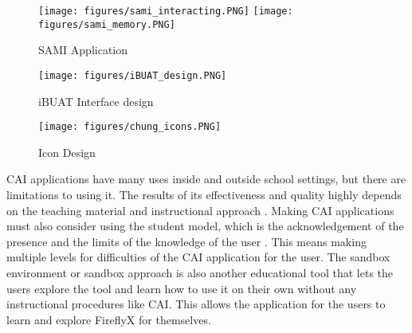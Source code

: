 \begin{figure}[H]
    \centering
    \texttt{[image: figures/sami\_interacting.PNG]}
    \texttt{[image: figures/sami\_memory.PNG]}
    \caption{SAMI Application \protect\cite{paule2017music}}
    \label{fig:sami_memory}
\end{figure}


\begin{figure}[H]
    \centering
    \texttt{[image: figures/iBUAT\_design.PNG]}
    \caption{iBUAT Interface design \protect\cite{ibharim2014ibuat}}
    \label{fig:iBuAT_ui}
\end{figure}


\begin{figure}[H]
    \centering
    \texttt{[image: figures/chung\_icons.PNG]}
    \caption{Icon Design \protect\cite{chung2017designing}}
    \label{fig:ICON_DES}
\end{figure}

CAI applications have many uses inside and outside school settings, but there are limitations to using it. The results of its effectiveness and quality highly depends on the teaching material and instructional approach \cite{aqda2011comparative}. Making CAI applications must also consider using the student model, which is the acknowledgement of the presence and the limits of the knowledge of the user \cite{self1974student}. This means making multiple levels for difficulties of the CAI application for the user. The sandbox environment or sandbox approach is also another educational tool that lets the users explore the tool and learn how to use it on their own without any instructional procedures like CAI. This allows the application for the users to learn and explore FireflyX for themselves.

